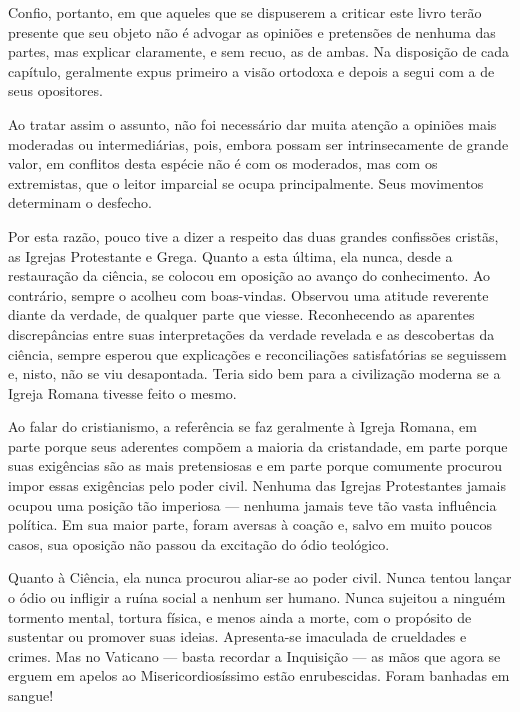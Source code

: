 \documentclass[11pt,a5paper,twoside,openany]{book}
\begin{document}
Confio, portanto, em que aqueles que se dispuserem a criticar este livro terão presente que seu objeto não é advogar as opiniões e pretensões de nenhuma das partes, mas explicar claramente, e sem recuo, as de ambas. Na disposição de cada capítulo, geralmente expus primeiro a visão ortodoxa e depois a segui com a de seus opositores.

Ao tratar assim o assunto, não foi necessário dar muita atenção a opiniões mais moderadas ou intermediárias, pois, embora possam ser intrinsecamente de grande valor, em conflitos desta espécie não é com os moderados, mas com os extremistas, que o leitor imparcial se ocupa principalmente. Seus movimentos determinam o desfecho.

Por esta razão, pouco tive a dizer a respeito das duas grandes confissões cristãs, as Igrejas Protestante e Grega. Quanto a esta última, ela nunca, desde a restauração da ciência, se colocou em oposição ao avanço do conhecimento. Ao contrário, sempre o acolheu com boas-vindas. Observou uma atitude reverente diante da verdade, de qualquer parte que viesse. Reconhecendo as aparentes discrepâncias entre suas interpretações da verdade revelada e as descobertas da ciência, sempre esperou que explicações e reconciliações satisfatórias se seguissem e, nisto, não se viu desapontada. Teria sido bem para a civilização moderna se a Igreja Romana tivesse feito o mesmo.

Ao falar do cristianismo, a referência se faz geralmente à Igreja Romana, em parte porque seus aderentes compõem a maioria da cristandade, em parte porque suas exigências são as mais pretensiosas e em parte porque comumente procurou impor essas exigências pelo poder civil. Nenhuma das Igrejas Protestantes jamais ocupou uma posição tão imperiosa — nenhuma jamais teve tão vasta influência política. Em sua maior parte, foram aversas à coação e, salvo em muito poucos casos, sua oposição não passou da excitação do ódio teológico.

Quanto à Ciência, ela nunca procurou aliar-se ao poder civil. Nunca tentou lançar o ódio ou infligir a ruína social a nenhum ser humano. Nunca sujeitou a ninguém tormento mental, tortura física, e menos ainda a morte, com o propósito de sustentar ou promover suas ideias. Apresenta-se imaculada de crueldades e crimes. Mas no Vaticano — basta recordar a Inquisição — as mãos que agora se erguem em apelos ao Misericordiosíssimo estão enrubescidas. Foram banhadas em sangue!
\end{document}
